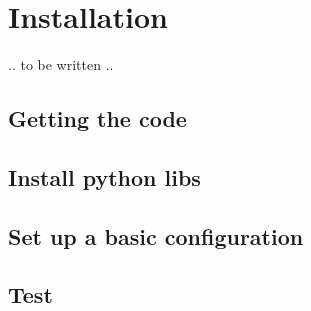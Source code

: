 \chapter{Installation}

.. to be written ..


\section{Getting the code}

\section{Install python libs}

\section{Set up a basic configuration}

\section{Test}
